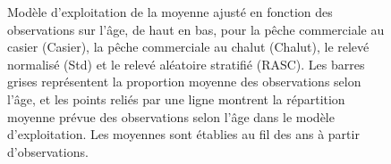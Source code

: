 \documentclass[11pt]{book}
\begin{document}
\begin{figure}[htb]

{\centering {} 

}

\caption{Modèle d’exploitation de la moyenne ajusté en fonction des observations sur l’âge, de haut en bas, pour la pêche commerciale au casier (Casier), la pêche commerciale au chalut (Chalut), le relevé normalisé (Std) et le relevé aléatoire stratifié (RASC). Les barres grises représentent la proportion moyenne des observations selon l’âge, et les points reliés par une ligne montrent la répartition moyenne prévue des observations selon l’âge dans le modèle d’exploitation. Les moyennes sont établies au fil des ans à partir d’observations.}\label{fig:unnamed-chunk-20}
\end{figure}
\newpage
\end{document}

